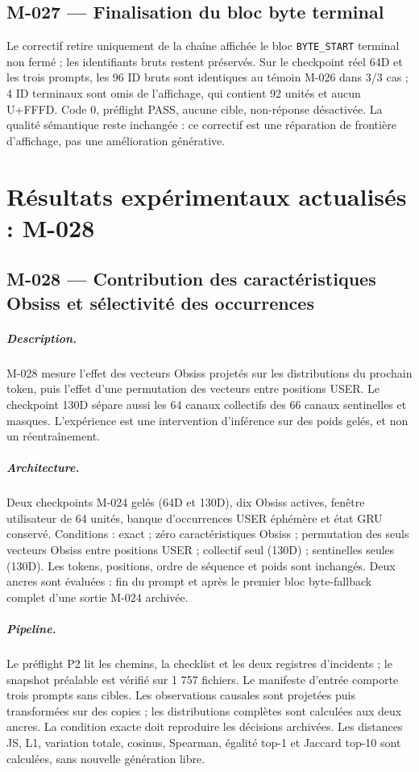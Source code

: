 \documentclass[11pt,a4paper]{report}
\begin{document}
\section{M-027 — Finalisation du bloc byte terminal}
\label{sec:m027-byte-finalization}
Le correctif retire uniquement de la chaîne affichée le bloc \texttt{BYTE\_START} terminal non fermé ; les identifiants bruts restent préservés. Sur le checkpoint réel 64D et les trois prompts, les 96 ID bruts sont identiques au témoin M-026 dans 3/3 cas ; 4 ID terminaux sont omis de l'affichage, qui contient 92 unités et aucun U+FFFD. Code 0, préflight PASS, aucune cible, non-réponse désactivée. La qualité sémantique reste inchangée : ce correctif est une réparation de frontière d'affichage, pas une amélioration générative.


\chapter{Résultats expérimentaux actualisés : M-028}
\section{M-028 — Contribution des caractéristiques Obsiss et sélectivité des occurrences}
\label{sec:m028-obsiss-features}
\paragraph{Description.} M-028 mesure l'effet des vecteurs Obsiss projetés sur les distributions du prochain token, puis l'effet d'une permutation des vecteurs entre positions USER. Le checkpoint 130D sépare aussi les 64 canaux collectifs des 66 canaux sentinelles et masques. L'expérience est une intervention d'inférence sur des poids gelés, et non un réentraînement.
\paragraph{Architecture.} Deux checkpoints M-024 gelés (64D et 130D), dix Obsiss actives, fenêtre utilisateur de 64 unités, banque d'occurrences USER éphémère et état GRU conservé. Conditions : exact ; zéro caractéristiques Obsiss ; permutation des seuls vecteurs Obsiss entre positions USER ; collectif seul (130D) ; sentinelles seules (130D). Les tokens, positions, ordre de séquence et poids sont inchangés. Deux ancres sont évaluées : fin du prompt et après le premier bloc byte-fallback complet d'une sortie M-024 archivée.
\paragraph{Pipeline.} Le préflight P2 lit les chemins, la checklist et les deux registres d'incidents ; le snapshot préalable est vérifié sur 1 757 fichiers. Le manifeste d'entrée comporte trois prompts sans cibles. Les observations causales sont projetées puis transformées sur des copies ; les distributions complètes sont calculées aux deux ancres. La condition exacte doit reproduire les décisions archivées. Les distances JS, L1, variation totale, cosinus, Spearman, égalité top-1 et Jaccard top-10 sont calculées, sans nouvelle génération libre.
\end{document}
